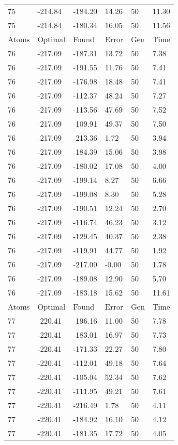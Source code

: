 \documentclass{report}
\begin{document}
\begin{appendix}
\begin{longtable}{llllll}
75 & -214.84 & -184.20 & 14.26 & 50 & 11.30 \\
75 & -214.84 & -180.34 & 16.05 & 50 & 11.56 \\
Atoms & Optimal & Found & Error & Gen & Time \\
76 & -217.09 & -187.31 & 13.72 & 50 & 7.38 \\
76 & -217.09 & -191.55 & 11.76 & 50 & 7.41 \\
76 & -217.09 & -176.98 & 18.48 & 50 & 7.41 \\
76 & -217.09 & -112.37 & 48.24 & 50 & 7.27 \\
76 & -217.09 & -113.56 & 47.69 & 50 & 7.52 \\
76 & -217.09 & -109.91 & 49.37 & 50 & 7.50 \\
76 & -217.09 & -213.36 & 1.72 & 50 & 3.94 \\
76 & -217.09 & -184.39 & 15.06 & 50 & 3.98 \\
76 & -217.09 & -180.02 & 17.08 & 50 & 4.00 \\
76 & -217.09 & -199.14 & 8.27 & 50 & 6.66 \\
76 & -217.09 & -199.08 & 8.30 & 50 & 5.28 \\
76 & -217.09 & -190.51 & 12.24 & 50 & 2.70 \\
76 & -217.09 & -116.74 & 46.23 & 50 & 3.12 \\
76 & -217.09 & -129.45 & 40.37 & 50 & 2.38 \\
76 & -217.09 & -119.91 & 44.77 & 50 & 1.92 \\
76 & -217.09 & -217.09 & -0.00 & 50 & 1.78 \\
76 & -217.09 & -189.08 & 12.90 & 50 & 5.70 \\
76 & -217.09 & -183.18 & 15.62 & 50 & 11.61 \\
Atoms & Optimal & Found & Error & Gen & Time \\
77 & -220.41 & -196.16 & 11.00 & 50 & 7.78 \\
77 & -220.41 & -183.01 & 16.97 & 50 & 7.73 \\
77 & -220.41 & -171.33 & 22.27 & 50 & 7.80 \\
77 & -220.41 & -112.01 & 49.18 & 50 & 7.64 \\
77 & -220.41 & -105.04 & 52.34 & 50 & 7.62 \\
77 & -220.41 & -111.95 & 49.21 & 50 & 7.61 \\
77 & -220.41 & -216.49 & 1.78 & 50 & 4.11 \\
77 & -220.41 & -184.92 & 16.10 & 50 & 4.12 \\
77 & -220.41 & -181.35 & 17.72 & 50 & 4.05 \\

\end{longtable}
\end{appendix}
\end{document}
